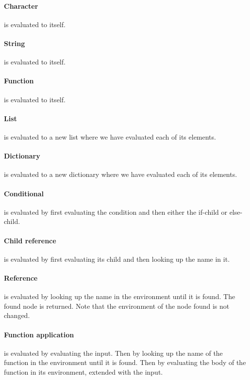 \documentclass[a4paper,12pt]{article}
\begin{document}
\paragraph{Character} is evaluated to itself.
\paragraph{String} is evaluated to itself.
\paragraph{Function} is evaluated to itself.
\paragraph{List} is evaluated to a new list where we have evaluated each of its elements.
\paragraph{Dictionary} is evaluated to a new dictionary where we have evaluated each of its elements.
\paragraph{Conditional} is evaluated by first evaluating the condition and then either the if-child or else-child.
\paragraph{Child reference} is evaluated by first evaluating its child and then looking up the name in it.
\paragraph{Reference} is evaluated by looking up the name in the environment until it is found. The found node is returned. Note that the environment of the node found is not changed.
\paragraph{Function application} is evaluated by evaluating the input. Then by looking up the name of the function in the environment until it is found. Then by evaluating the body of the function in its environment, extended with the input.
\end{document}
